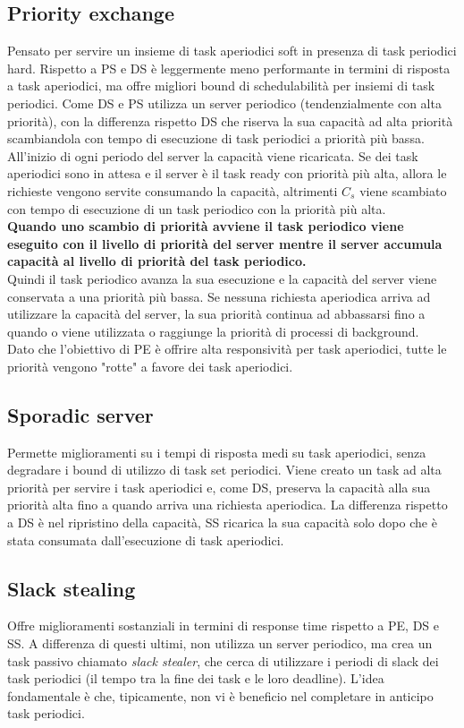 \documentclass[12pt]{article}
\begin{document}
\subsection{Priority exchange}
\label{sec:priorityExchange}
Pensato per servire un insieme di task aperiodici soft in presenza di task periodici hard.
Rispetto a PS e DS è leggermente meno performante in termini di risposta a task aperiodici, ma offre migliori bound di schedulabilità per insiemi di task periodici.
Come DS e PS utilizza un server periodico (tendenzialmente con alta priorità), con la differenza rispetto DS che riserva la sua capacità ad alta priorità scambiandola con tempo di esecuzione di task periodici a priorità più bassa.
All'inizio di ogni periodo del server la capacità viene ricaricata. Se dei task aperiodici sono in attesa e il server è il task ready con priorità più alta, allora le richieste vengono servite consumando la capacità, altrimenti $C_s$ viene scambiato con tempo di esecuzione di un task periodico con la priorità più alta.
\\
\textbf{Quando uno scambio di priorità avviene il task periodico viene eseguito con il livello di priorità del server mentre il server accumula capacità al livello di priorità del task
periodico.}\\
Quindi il task periodico avanza la sua esecuzione e la capacità del server viene conservata a una priorità più bassa.
Se nessuna richiesta aperiodica arriva ad utilizzare la capacità del server, la sua priorità continua ad abbassarsi fino a quando o viene utilizzata o raggiunge la priorità di processi di background.
\\
Dato che l'obiettivo di PE è offrire alta responsività per task aperiodici, tutte le priorità vengono "rotte" a favore dei task aperiodici.
\subsection{Sporadic server}
\label{sec:sporadicServer}
Permette miglioramenti su i tempi di risposta medi su task aperiodici, senza degradare i bound di utilizzo di task set periodici.
Viene creato un task ad alta priorità per servire i task aperiodici e, come DS, preserva la capacità alla sua priorità alta fino a quando arriva una richiesta aperiodica.
La differenza rispetto a DS è nel ripristino della capacità, SS ricarica la sua capacità solo dopo che è stata consumata dall'esecuzione di task aperiodici.
\subsection{Slack stealing}
\label{sec:slackStealing}
Offre miglioramenti sostanziali in termini di response time rispetto a PE, DS e SS.
A differenza di questi ultimi, non utilizza un server periodico, ma crea un task passivo chiamato \textit{slack stealer},
che cerca di utilizzare i periodi di slack dei task periodici (il tempo tra la fine dei task e le loro deadline).
L'idea fondamentale è che, tipicamente, non vi è beneficio nel completare in anticipo task periodici.
\end{document}
